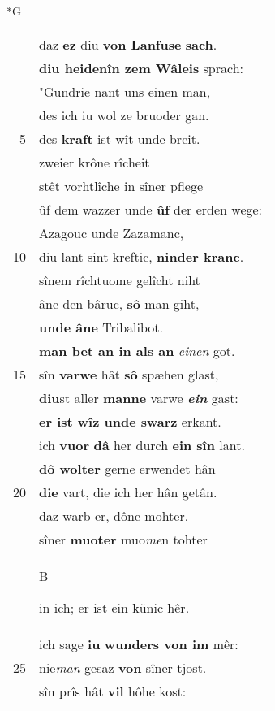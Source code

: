 \documentclass[8pt,a4paper,notitlepage]{article}
\begin{document}
\newpage
\begin{table}[ht]
\begin{minipage}[t]{0.5\linewidth}
\small
\begin{center}*G
\end{center}
\begin{tabular}{rl}
 & daz \textbf{ez} diu \textbf{von Lanfuse} \textbf{sach}.\\ 
 & \textbf{diu heidenîn zem Wâleis} sprach:\\ 
 & "Gundrie nant uns einen man,\\ 
 & des ich iu wol ze bruoder gan.\\ 
5 & des \textbf{kraft} ist wît unde breit.\\ 
 & zweier krône rîcheit\\ 
 & stêt vorhtlîche in sîner pflege\\ 
 & ûf dem wazzer unde \textbf{ûf} der erden wege:\\ 
 & Azagouc unde Zazamanc,\\ 
10 & diu lant sint kreftic, \textbf{ninder kranc}.\\ 
 & sînem rîchtuome gelîcht niht\\ 
 & âne den bâruc, \textbf{sô} man giht,\\ 
 & \textbf{unde âne} Tribalibot.\\ 
 & \textbf{man bet an in als an} \textit{einen} got.\\ 
15 & sîn \textbf{varwe} hât \textbf{sô} spæhen glast,\\ 
 & \textbf{diu}st aller \textbf{manne} varwe \textit{\textbf{ein}} gast:\\ 
 & \textbf{er ist wîz unde swarz} erkant.\\ 
 & ich \textbf{vuor} \textbf{dâ} her durch \textbf{ein sîn} lant.\\ 
 & \textbf{dô wolter} gerne erwendet hân\\ 
20 & \textbf{die} vart, die ich her hân getân.\\ 
 & daz warb er, dône mohter.\\ 
 & sîner \textbf{muoter} muo\textit{me}n tohter\\ 
 & \begin{large}B\end{large}in ich; er ist ein künic hêr.\\ 
 & ich sage \textbf{iu} \textbf{wunders von im} mêr:\\ 
25 & nie\textit{man} gesaz \textbf{von} sîner tjost.\\ 
 & sîn prîs hât \textbf{vil} hôhe kost:\\ 

\end{tabular}
\end{minipage}
\end{table}
\end{document}
